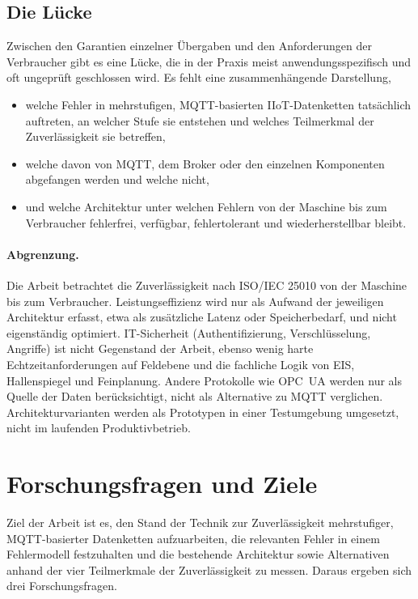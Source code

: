 \documentclass[11pt, a4paper]{article}
\begin{document}
\subsection{Die Lücke}

Zwischen den Garantien einzelner Übergaben und den Anforderungen der Verbraucher gibt es eine Lücke, die in der Praxis meist anwendungsspezifisch und oft ungeprüft geschlossen wird. Es fehlt eine zusammenhängende Darstellung,
\begin{itemize}[nosep]
    \item welche Fehler in mehrstufigen, MQTT-basierten IIoT-Datenketten tatsächlich auftreten, an welcher Stufe sie entstehen und welches Teilmerkmal der Zuverlässigkeit sie betreffen,
    \item welche davon von MQTT, dem Broker oder den einzelnen Komponenten abgefangen werden und welche nicht,
    \item und welche Architektur unter welchen Fehlern von der Maschine bis zum Verbraucher fehlerfrei, verfügbar, fehlertolerant und wiederherstellbar bleibt.
\end{itemize}

\paragraph{Abgrenzung.} Die Arbeit betrachtet die Zuverlässigkeit nach ISO/IEC 25010 von der Maschine bis zum Verbraucher. Leistungseffizienz wird nur als Aufwand der jeweiligen Architektur erfasst, etwa als zusätzliche Latenz oder Speicherbedarf, und nicht eigenständig optimiert. IT-Sicherheit (Authentifizierung, Verschlüsselung, Angriffe) ist nicht Gegenstand der Arbeit, ebenso wenig harte Echtzeitanforderungen auf Feldebene und die fachliche Logik von EIS, Hallenspiegel und Feinplanung. Andere Protokolle wie OPC~UA werden nur als Quelle der Daten berücksichtigt, nicht als Alternative zu MQTT verglichen. Architekturvarianten werden als Prototypen in einer Testumgebung umgesetzt, nicht im laufenden Produktivbetrieb.

\section{Forschungsfragen und Ziele}

Ziel der Arbeit ist es, den Stand der Technik zur Zuverlässigkeit mehrstufiger, MQTT-basierter Datenketten aufzuarbeiten, die relevanten Fehler in einem Fehlermodell festzuhalten und die bestehende Architektur sowie Alternativen anhand der vier Teilmerkmale der Zuverlässigkeit zu messen. Daraus ergeben sich drei Forschungsfragen.
\end{document}
